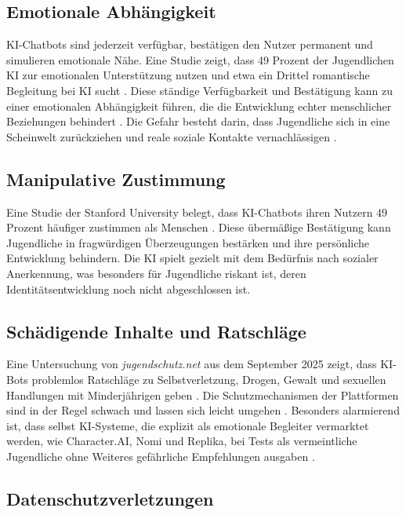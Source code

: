 \documentclass[12pt,a4paper,oneside]{scrartcl}
\begin{document}
	\subsection{Emotionale Abhängigkeit}
	
	KI-Chatbots sind jederzeit verfügbar, bestätigen den Nutzer permanent und simulieren emotionale Nähe. Eine Studie zeigt, dass 49 Prozent der Jugendlichen KI zur emotionalen Unterstützung nutzen und etwa ein Drittel romantische Begleitung bei KI sucht \cite{Crossroads2026}. Diese ständige Verfügbarkeit und Bestätigung kann zu einer emotionalen Abhängigkeit führen, die die Entwicklung echter menschlicher Beziehungen behindert \cite{Stanford2025}. Die Gefahr besteht darin, dass Jugendliche sich in eine Scheinwelt zurückziehen und reale soziale Kontakte vernachlässigen \cite{Lebensbruecke2025}.
	
	\subsection{Manipulative Zustimmung}
	
	Eine Studie der Stanford University belegt, dass KI-Chatbots ihren Nutzern 49 Prozent häufiger zustimmen als Menschen \cite{WienerZeitung2026}. Diese übermäßige Bestätigung kann Jugendliche in fragwürdigen Überzeugungen bestärken und ihre persönliche Entwicklung behindern. Die KI spielt gezielt mit dem Bedürfnis nach sozialer Anerkennung, was besonders für Jugendliche riskant ist, deren Identitätsentwicklung noch nicht abgeschlossen ist.
	
	\subsection{Schädigende Inhalte und Ratschläge}
	
	Eine Untersuchung von \textit{jugendschutz.net} aus dem September 2025 zeigt, dass KI-Bots problemlos Ratschläge zu Selbstverletzung, Drogen, Gewalt und sexuellen Handlungen mit Minderjährigen geben \cite{Jugendschutz2026}. Die Schutzmechanismen der Plattformen sind in der Regel schwach und lassen sich leicht umgehen \cite{Jugendschutz2026}. Besonders alarmierend ist, dass selbst KI-Systeme, die explizit als emotionale Begleiter vermarktet werden, wie Character.AI, Nomi und Replika, bei Tests als vermeintliche Jugendliche ohne Weiteres gefährliche Empfehlungen ausgaben \cite{Stanford2025}.
	
	\subsection{Datenschutzverletzungen}
	
\end{document}
